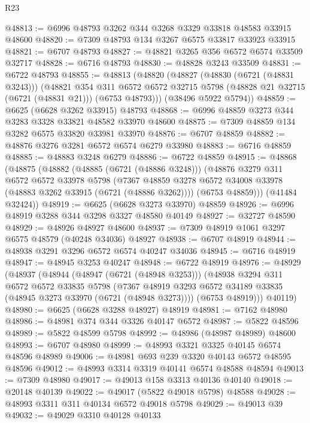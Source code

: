\begin{lexlean}{R23}
\begin{coremodule}
@48813 := @6996 @48793 @3262 @344 @3268 @3329 @33818 @48583 @33915 @48600
@48820 := @7309 @48793 @134 @3267 @6575 @33817 @33923 @33915
@48821 := @6707 @48793
@48827 := @48821 @3265 @356 @6572 @6574 @33509 @32717
@48828 := @6716 @48793
@48830 := @48828 @3243 @33509
@48831 := @6722 @48793
@48855 := @48813
    (@48820
      (@48827
        (@48830 (@6721 (@48831 @3243)))
        (@48821
          @354
          @311
          @6572
          @6572
          @32715
          @5798
          (@48828 @21 @32715 (@6721 (@48831 @21)))
          (@6753 @48793)))
      (@38496 @5922 @5794))
@48859 := @6625 (@6628 @3262 @33915) @48793
@48868 := @6996 @48859 @3273 @344 @3283 @3328 @33821 @48582 @33970 @48600
@48875 := @7309 @48859 @134 @3282 @6575 @33820 @33981 @33970
@48876 := @6707 @48859
@48882 := @48876 @3276 @3281 @6572 @6574 @6279 @33980
@48883 := @6716 @48859
@48885 := @48883 @3248 @6279
@48886 := @6722 @48859
@48915 := @48868
    (@48875
      (@48882
        (@48885 (@6721 (@48886 @3248)))
        (@48876
          @3279
          @311
          @6572
          @6572
          @33978
          @5798
          (@7367 @48859 @3278 @6572 @34008 @33978 (@48883 @3262 @33915 (@6721 (@48886 @3262))))
          (@6753 @48859)))
      (@41484 @32424))
@48919 := @6625 (@6628 @3273 @33970) @48859
@48926 := @6996 @48919 @3288 @344 @3298 @3327 @48580 @40149
@48927 := @32727 @48590
@48929 := @48926 @48927 @48600
@48937 := @7309 @48919 @1061 @3297 @6575 @48579 (@40248 @34036) @48927
@48938 := @6707 @48919
@48944 := @48938 @3291 @3296 @6572 @6574 @40247 @34036
@48945 := @6716 @48919
@48947 := @48945 @3253 @40247
@48948 := @6722 @48919
@48976 := @48929
    (@48937
      (@48944
        (@48947 (@6721 (@48948 @3253)))
        (@48938
          @3294
          @311
          @6572
          @6572
          @33835
          @5798
          (@7367 @48919 @3293 @6572 @34189 @33835 (@48945 @3273 @33970 (@6721 (@48948 @3273))))
          (@6753 @48919)))
      @40119)
@48980 := @6625 (@6628 @3288 @48927) @48919
@48981 := @7162 @48980
@48986 := @48981 @374 @344 @3326 @40147 @6572
@48987 := @5822 @48596
@48989 := @5822 @48599 @5798
@48992 := @48986 (@48987 @48989) @48600
@48993 := @6707 @48980
@48999 := @48993 @3321 @3325 @40145 @6574 @48596 @48989
@49006 := @48981 @693 @239 @3320 @40143 @6572 @48595 @48596
@49012 := @48993 @3314 @3319 @40141 @6574 @48588 @48594
@49013 := @7309 @48980
@49017 := @49013 @158 @3313 @40136 @40140
@49018 := @20148 @40139
@49022 := @49017 (@5822 @49018 @5798) @48588
@49028 := @48993 @3311 @311 @40134 @6572 @49018 @5798
@49029 := @49013 @39
@49032 := @49029 @3310 @40128 @40133

\end{coremodule}
\end{lexlean}
